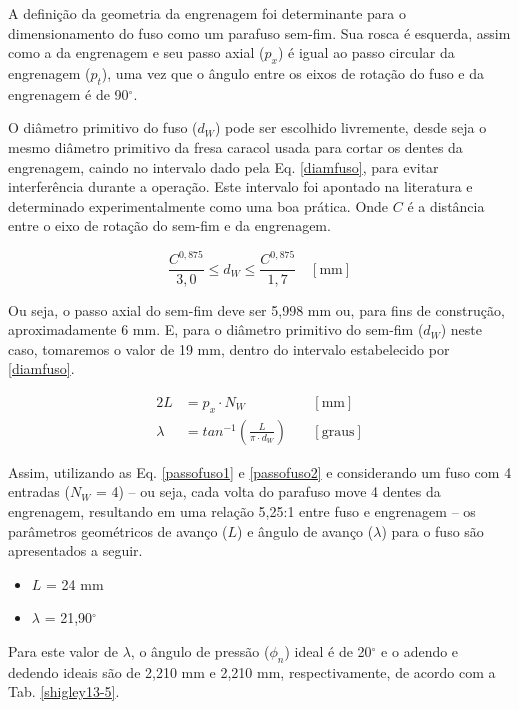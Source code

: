 A definição da geometria da engrenagem foi determinante para o dimensionamento do fuso como um parafuso sem-fim. Sua rosca é esquerda, assim como a da engrenagem e seu passo axial ($p_x$) é igual ao passo circular da engrenagem ($p_t$), uma vez que o ângulo entre os eixos de rotação do fuso e da engrenagem é de 90$^{\circ}$. 

O diâmetro primitivo do fuso ($d_W$) pode ser escolhido livremente, desde seja o mesmo diâmetro primitivo da fresa caracol usada para cortar os dentes da engrenagem, caindo no intervalo dado pela Eq. \ref{diamfuso}, para evitar interferência durante a operação. Este intervalo foi apontado na literatura e determinado experimentalmente como uma boa prática. Onde $C$ é a distância entre o eixo de rotação do sem-fim e da engrenagem. \cite{shigley2005}

\begin{equation}
\label{diamfuso}
  \frac{C^{0,875}}{3,0} \le d_W \le \frac{C^{0,875}}{1,7} \quad [\text{mm}]
\end{equation}

Ou seja, o passo axial do sem-fim deve ser 5,998 mm ou, para fins de construção, aproximadamente 6 mm. E, para o diâmetro primitivo do sem-fim ($d_W$) neste caso, tomaremos o valor de 19 mm, dentro do intervalo estabelecido por \ref{diamfuso}.

\begin{alignat}{2}
    \label{passofuso1}
    L & = p_x \cdot N_W \quad & [\text{mm}] \\
    \label{passofuso2}
    \lambda & = tan^{-1}\left(\frac{L}{\pi \cdot d_W}\right) \quad & [\text{graus}]
\end{alignat}

Assim, utilizando as Eq. \ref{passofuso1} e \ref{passofuso2} e considerando um fuso com 4 entradas ($N_W$ = 4) –  ou seja, cada volta do parafuso move 4 dentes da engrenagem, resultando em uma relação 5,25:1 entre fuso e engrenagem – os parâmetros geométricos de avanço ($L$) e ângulo de avanço ($\lambda$) para o fuso são apresentados a seguir.

\begin{itemize} 
    \item $L$ = 24 mm
    \item $\lambda$ = 21,90$^{\circ}$
\end{itemize}

Para este valor de $\lambda$, o ângulo de pressão ($\phi_n$) ideal é de 20$^{\circ}$ e o adendo e dedendo ideais são de 2,210 mm e 2,210 mm, respectivamente, de acordo com a Tab. \ref{shigley13-5}.

